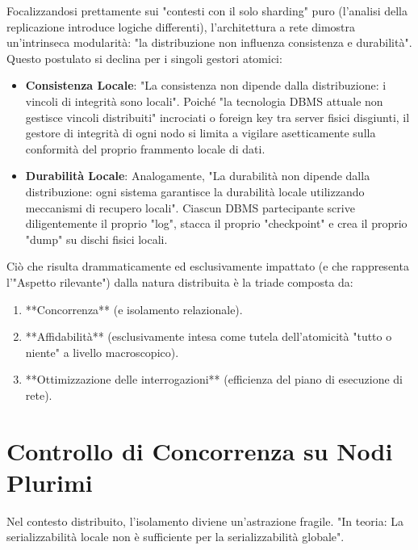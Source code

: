 Focalizzandosi prettamente sui "contesti con il solo sharding" puro (l'analisi della replicazione introduce logiche differenti), l'architettura a rete dimostra un'intrinseca modularità: "la distribuzione non influenza consistenza e durabilità".
Questo postulato si declina per i singoli gestori atomici:
\begin{itemize}
    \item \textbf{Consistenza Locale}: "La consistenza non dipende dalla distribuzione: i vincoli di integrità sono locali". Poiché "la tecnologia DBMS attuale non gestisce vincoli distribuiti" incrociati o foreign key tra server fisici disgiunti, il gestore di integrità di ogni nodo si limita a vigilare asetticamente sulla conformità del proprio frammento locale di dati.
    \item \textbf{Durabilità Locale}: Analogamente, "La durabilità non dipende dalla distribuzione: ogni sistema garantisce la durabilità locale utilizzando meccanismi di recupero locali". Ciascun DBMS partecipante scrive diligentemente il proprio "log", stacca il proprio "checkpoint" e crea il proprio "dump" su dischi fisici locali.
\end{itemize}

Ciò che risulta drammaticamente ed esclusivamente impattato (e che rappresenta l'"Aspetto rilevante") dalla natura distribuita è la triade composta da:
\begin{enumerate}
    \item **Concorrenza** (e isolamento relazionale).
    \item **Affidabilità** (esclusivamente intesa come tutela dell'atomicità "tutto o niente" a livello macroscopico).
    \item **Ottimizzazione delle interrogazioni** (efficienza del piano di esecuzione di rete).
\end{enumerate}

\section{Controllo di Concorrenza su Nodi Plurimi}

Nel contesto distribuito, l'isolamento diviene un'astrazione fragile.
"In teoria: La serializzabilità locale non è sufficiente per la serializzabilità globale".

